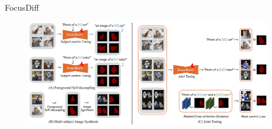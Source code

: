 \documentclass[8pt]{beamer}
\begin{document}
\begin{frame}{FocusDiff}
    \begin{figure}
        \centering
        \includegraphics[width=0.95\textwidth]{demo/ppt-5.pdf}
    \end{figure}
\end{frame}
\end{document}
